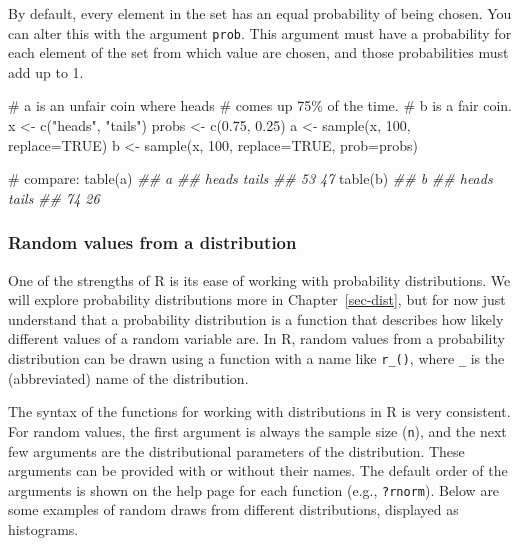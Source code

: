 \documentclass[
  13,
  letterpaper,
]{report}
\newenvironment{Shaded}{\begin{snugshade}}{\end{snugshade}}
\newcommand{\AttributeTok}[1]{\textcolor[rgb]{0.40,0.45,0.13}{#1}}
\newcommand{\CommentTok}[1]{\textcolor[rgb]{0.37,0.37,0.37}{#1}}
\newcommand{\ConstantTok}[1]{\textcolor[rgb]{0.56,0.35,0.01}{#1}}
\newcommand{\DecValTok}[1]{\textcolor[rgb]{0.68,0.00,0.00}{#1}}
\newcommand{\DocumentationTok}[1]{\textcolor[rgb]{0.37,0.37,0.37}{\textit{#1}}}
\newcommand{\FloatTok}[1]{\textcolor[rgb]{0.68,0.00,0.00}{#1}}
\newcommand{\FunctionTok}[1]{\textcolor[rgb]{0.28,0.35,0.67}{#1}}
\newcommand{\NormalTok}[1]{\textcolor[rgb]{0.00,0.23,0.31}{#1}}
\newcommand{\OtherTok}[1]{\textcolor[rgb]{0.00,0.23,0.31}{#1}}
\newcommand{\StringTok}[1]{\textcolor[rgb]{0.13,0.47,0.30}{#1}}
\begin{document}
By default, every element in the set has an equal probability of being
chosen. You can alter this with the argument \texttt{prob}. This
argument must have a probability for each element of the set from which
value are chosen, and those probabilities must add up to 1.

\begin{Shaded}
\begin{Highlighting}[]
\CommentTok{\# a is an unfair coin where heads}
\CommentTok{\# comes up 75\% of the time.}
\CommentTok{\# b is a fair coin.}
\NormalTok{x }\OtherTok{\textless{}{-}} \FunctionTok{c}\NormalTok{(}\StringTok{"heads"}\NormalTok{, }\StringTok{"tails"}\NormalTok{)}
\NormalTok{probs }\OtherTok{\textless{}{-}} \FunctionTok{c}\NormalTok{(}\FloatTok{0.75}\NormalTok{, }\FloatTok{0.25}\NormalTok{)}
\NormalTok{a }\OtherTok{\textless{}{-}} \FunctionTok{sample}\NormalTok{(x, }\DecValTok{100}\NormalTok{, }\AttributeTok{replace=}\ConstantTok{TRUE}\NormalTok{)}
\NormalTok{b }\OtherTok{\textless{}{-}} \FunctionTok{sample}\NormalTok{(x, }\DecValTok{100}\NormalTok{, }\AttributeTok{replace=}\ConstantTok{TRUE}\NormalTok{, }\AttributeTok{prob=}\NormalTok{probs)}

\CommentTok{\# compare:}
\FunctionTok{table}\NormalTok{(a)}
\DocumentationTok{\#\# a}
\DocumentationTok{\#\# heads tails }
\DocumentationTok{\#\#    53    47}
\FunctionTok{table}\NormalTok{(b)}
\DocumentationTok{\#\# b}
\DocumentationTok{\#\# heads tails }
\DocumentationTok{\#\#    74    26}
\end{Highlighting}
\end{Shaded}

\subsubsection{Random values from a
distribution}\label{sec-manip-make-rand-dist}

One of the strengths of R is its ease of working with probability
distributions. We will explore probability distributions more in
Chapter~\ref{sec-dist}, but for now just understand that a probability
distribution is a function that describes how likely different values of
a random variable are. In R, random values from a probability
distribution can be drawn using a function with a name like
\texttt{r\_()}, where \texttt{\_} is the (abbreviated) name of the
distribution.

The syntax of the functions for working with distributions in R is very
consistent. For random values, the first argument is always the sample
size (\texttt{n}), and the next few arguments are the distributional
parameters of the distribution. These arguments can be provided with or
without their names. The default order of the arguments is shown on the
help page for each function (e.g., \texttt{?rnorm}). Below are some
examples of random draws from different distributions, displayed as
histograms.
\end{document}
